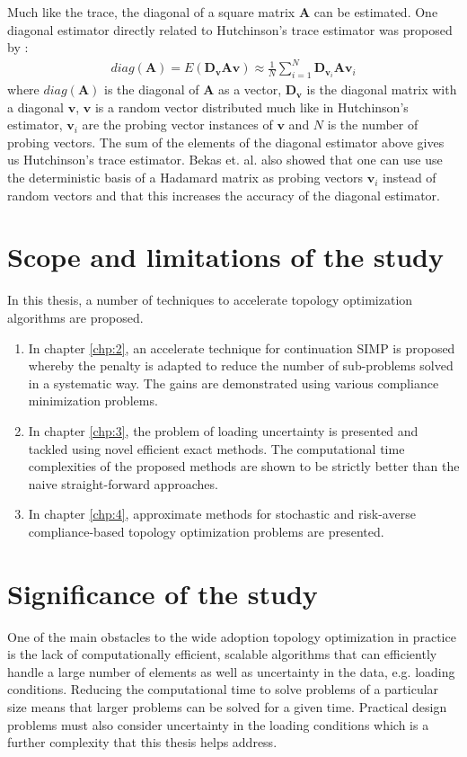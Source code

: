 Much like the trace, the diagonal of a square matrix $\bm{A}$ can be estimated. One diagonal estimator directly related to Hutchinson's trace estimator was proposed by \cite{Bekas2007}:
\begin{align}
  diag(\bm{A}) = E(\bm{D}_{\bm{v}} \bm{A} \bm{v}) \approx \frac{1}{N} \sum_{i=1}^N \bm{D}_{\bm{v}_i} \bm{A} \bm{v}_i
\end{align}
where $diag(\bm{A})$ is the diagonal of $\bm{A}$ as a vector, $\bm{D}_{\bm{v}}$ is the diagonal matrix with a diagonal $\bm{v}$, $\bm{v}$ is a random vector distributed much like in Hutchinson's estimator, $\bm{v}_i$ are the probing vector instances of $\bm{v}$ and $N$ is the number of probing vectors. The sum of the elements of the diagonal estimator above gives us Hutchinson's trace estimator. Bekas et. al. also showed that one can use use the deterministic basis of a Hadamard matrix as probing vectors $\bm{v}_i$ instead of random vectors and that this increases the accuracy of the diagonal estimator.

\newpage
\section{Scope and limitations of the study}

In this thesis, a number of techniques to accelerate topology optimization algorithms are proposed.
\begin{enumerate}
    \item In chapter \ref{chp:2}, an accelerate technique for continuation SIMP is proposed whereby the penalty is adapted to reduce the number of sub-problems solved in a systematic way. The gains are demonstrated using various compliance minimization problems.
    \item In chapter \ref{chp:3}, the problem of loading uncertainty is presented and tackled using novel efficient exact methods. The computational time complexities of the proposed methods are shown to be strictly better than the naive straight-forward approaches.
    \item In chapter \ref{chp:4}, approximate methods for stochastic and risk-averse compliance-based topology optimization problems are presented.
\end{enumerate}

\newpage
\section{Significance of the study}

One of the main obstacles to the wide adoption topology optimization in practice is the lack of computationally efficient, scalable algorithms that can efficiently handle a large number of elements as well as uncertainty in the data, e.g. loading conditions. Reducing the computational time to solve problems of a particular size means that larger problems can be solved for a given time. Practical design problems must also consider uncertainty in the loading conditions which is a further complexity that this thesis helps address.

\clearpage
\newpage
